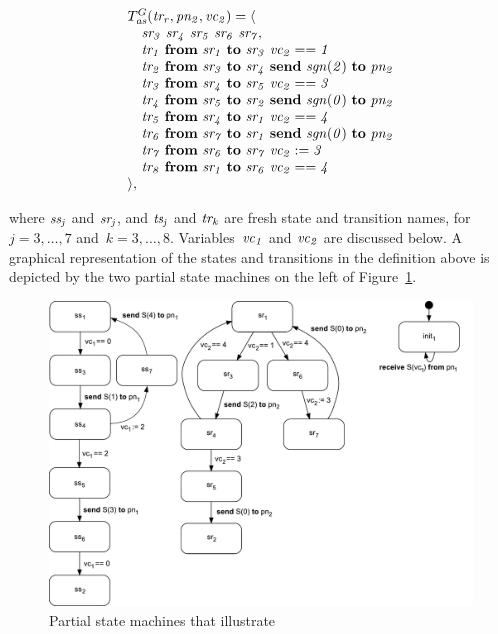 \[
\begin{array}{l}
T^G_{\it{as}}(\it{tr_r}, \it{pn_2}, \it{vc_2}) = \langle \\
\quad \it{sr_3}~\it{sr_4}~\it{sr_5}~\it{sr_6}~\it{sr_7}, \\
\quad \it{tr_1}~\textbf{from}~\it{sr_1}~\textbf{to}~\it{sr_3}~\it{vc_2}==1 \\
\quad \it{tr_2}~\textbf{from}~\it{sr_3}~\textbf{to}~\it{sr_4}~\textbf{send}~\it{sgn}(2)~\textbf{to}~\it{pn_2} \\
\quad \it{tr_3}~\textbf{from}~\it{sr_4}~\textbf{to}~\it{sr_5}~\it{vc_2}==3 \\
\quad \it{tr_4}~\textbf{from}~\it{sr_5}~\textbf{to}~\it{sr_2}~\textbf{send}~\it{sgn}(0)~\textbf{to}~\it{pn_2} \\
\quad \it{tr_5}~\textbf{from}~\it{sr_4}~\textbf{to}~\it{sr_1}~\it{vc_2}==4 \\
\quad \it{tr_6}~\textbf{from}~\it{sr_7}~\textbf{to}~\it{sr_1}~\textbf{send}~\it{sgn}(0)~\textbf{to}~\it{pn_2} \\
\quad \it{tr_7}~\textbf{from}~\it{sr_6}~\textbf{to}~\it{sr_7}~\it{vc_2}:=3 \\
\quad \it{tr_8}~\textbf{from}~\it{sr_1}~\textbf{to}~\it{sr_6}~\it{vc_2}==4 \\
\rangle,
\end{array}
\]

\noindent
where $\it{ss_j}$ and $\it{sr_j}$, and $\it{ts_j}$ and $\it{tr_k}$ are fresh state and transition names, for~$j=3,\ldots,7$ and~$k=3,\ldots,8$.
Variables~$\it{vc}_1$ and $\it{vc}_2$ are discussed below.
A graphical representation of the states and transitions in the definition above is depicted by the two partial state machines on the left of Figure~\ref{fig:reusable-correct-transformations:trans_general}.

\begin{figure}[hbt]
  \centering
  \includegraphics[scale=0.45]{reusable-correct-transformations/figs/transformation_general}
  \caption{Partial state machines that illustrate \TGen}
  \label{fig:reusable-correct-transformations:trans_general}
\end{figure}

